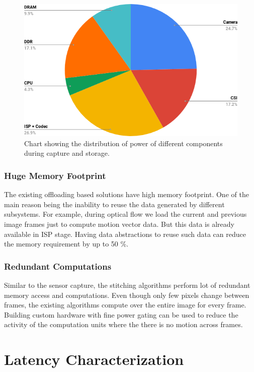 \begin{figure}[h]
	\begin{center}
		\includegraphics[width=1\textwidth]{data/images/chart.png}
	\end{center}
	\caption{Chart showing the distribution of power of different components during capture and storage.}	
	\label{fig:pieCapPow}
\end{figure} 

\subsubsection{Huge Memory Footprint}
The existing offloading based solutions have high memory footprint. One of the main reason being the inability to reuse the data generated by different subsystems. For example, during optical flow we load the current and previous image frames just to compute motion vector data. But this data is already available in ISP stage. Having data abstractions to reuse such data can reduce the memory requirement by up to 50 \%.


\subsubsection{Redundant Computations}
Similar to the sensor capture, the stitching algorithms perform lot of redundant memory access and computations. Even though only few pixels change between frames, the existing algorithms compute over the entire image for every frame. Building custom hardware with fine power gating can be used to reduce the activity of the computation units where the there is no motion across frames. 



\section{Latency Characterization}

